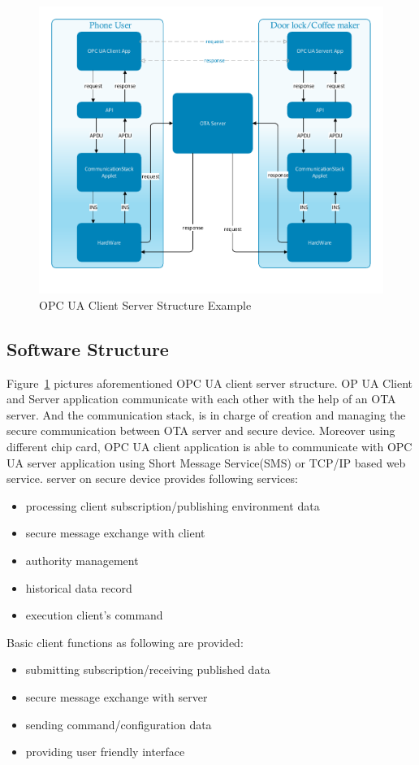 \documentclass[]{llncs}
\begin{document}
 \begin{figure}[ht]

	\centering
	\includegraphics[width=1.1\textwidth]{csoverview}
		\caption[ ]{OPC UA Client Server Structure Example}
	\label{fig:softwareStructure}
\end{figure}


\subsection {Software Structure}
Figure~\ref{fig:softwareStructure} pictures aforementioned OPC UA client server structure. OP UA Client and Server application communicate with each other with the help of an OTA server. And the communication stack,  is in charge of creation and managing the secure communication between OTA server and secure device. Moreover using different chip card, OPC UA client application is able to communicate with OPC UA server application using Short Message Service(SMS) or TCP/IP based web service. 
\newline
server on secure device provides following services:
 \begin{itemize}
  \item processing client subscription/publishing environment data
  \item secure message exchange with client
  \item authority management
  \item historical data record
  \item execution client's command
\end{itemize}
Basic client functions as following are provided:
 \begin{itemize}
  \item submitting subscription/receiving published data
  \item secure message exchange with server
  \item sending command/configuration data
  \item providing user friendly interface
\end{itemize}
\end{document}
